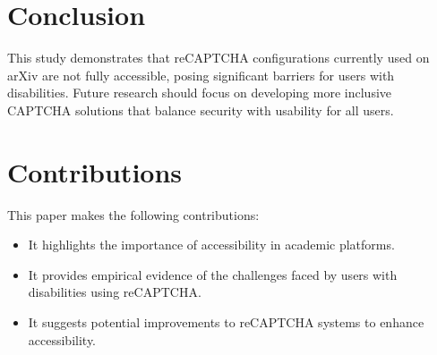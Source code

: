 \documentclass{article}
\begin{document}
\section{Conclusion}
This study demonstrates that reCAPTCHA configurations currently used on arXiv are not fully accessible, posing significant barriers for users with disabilities. Future research should focus on developing more inclusive CAPTCHA solutions that balance security with usability for all users.

\section{Contributions}
This paper makes the following contributions:
\begin{itemize}
    \item It highlights the importance of accessibility in academic platforms.
    \item It provides empirical evidence of the challenges faced by users with disabilities using reCAPTCHA.
    \item It suggests potential improvements to reCAPTCHA systems to enhance accessibility.
\end{itemize}



\end{document}
